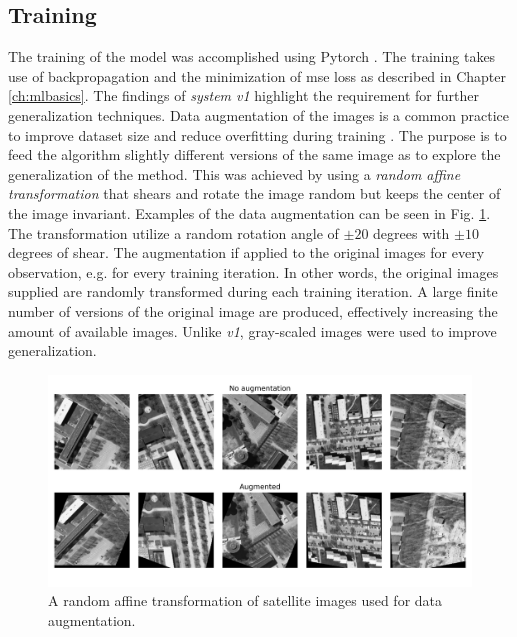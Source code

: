\subsection{Training}\label{sec:training_v2}
The training of the model was accomplished using Pytorch \cite{Paszke2017AutomaticPyTorch}. The training takes use of backpropagation and the minimization of \gls{mse} loss as described in Chapter \ref{ch:mlbasics}. The findings of \emph{system v1} highlight the requirement for further generalization techniques. Data augmentation of the images is a common practice to improve dataset size and reduce overfitting during training \cite{Shorten2019ALearning}. The purpose is to feed the algorithm slightly different versions of the same image as to explore the generalization of the method. This was achieved by using a \emph{random  affine  transformation} that shears and rotate the image random but keeps the center of the image invariant. Examples of the data augmentation can be seen in Fig. \ref{fig:data_augmentation}. The transformation utilize a random rotation angle of $\pm 20$ degrees with $\pm 10$ degrees of shear. The augmentation if applied to the original images for every observation, e.g. for every training iteration. In other words, the original images supplied are randomly transformed during each training iteration. A large finite number of versions of the original image are produced, effectively increasing the amount of available images. Unlike \emph{v1}, gray-scaled images were used to improve generalization. 


\begin{figure}
    \centering
    \includegraphics{chapters/part_pathloss/model_aided_paper/data_augmentation.png}
    \caption{A random affine transformation of satellite images used for data augmentation.}
    \label{fig:data_augmentation}
\end{figure}

